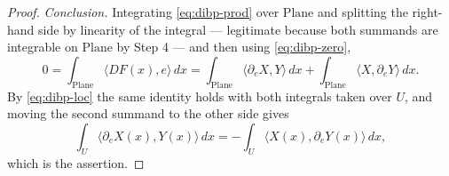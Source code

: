 \begin{proof}
\medskip\noindent\emph{Conclusion.}
Integrating \eqref{eq:dibp-prod} over $\mathrm{Plane}$ and splitting the right-hand side by
linearity of the integral --- legitimate because both summands are integrable on
$\mathrm{Plane}$ by Step 4 --- and then using \eqref{eq:dibp-zero},
\[
  0=\int_{\mathrm{Plane}}\bigl\langle DF(x),e\bigr\rangle\,dx
   =\int_{\mathrm{Plane}}\bigl\langle\partial_eX,Y\bigr\rangle\,dx
   +\int_{\mathrm{Plane}}\bigl\langle X,\partial_eY\bigr\rangle\,dx .
\]
By \eqref{eq:dibp-loc} the same identity holds with both integrals taken over $U$, and moving
the second summand to the other side gives
\[
  \int_U\bigl\langle\partial_eX(x),Y(x)\bigr\rangle\,dx
  =-\int_U\bigl\langle X(x),\partial_eY(x)\bigr\rangle\,dx ,
\]
which is the assertion.
\end{proof}
